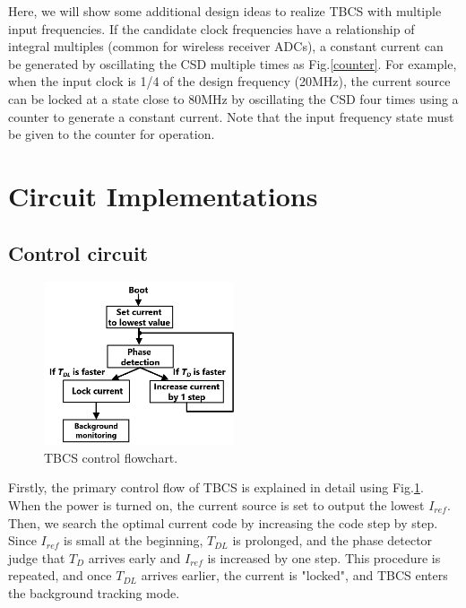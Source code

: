 \documentclass[paper]{ieice}
\begin{document}
Here, we will show some additional design ideas to realize TBCS with multiple input frequencies. If the candidate clock frequencies have a relationship of integral multiples (common for wireless receiver ADCs), a constant current can be generated by oscillating the CSD multiple times as Fig.\ref{counter}. For example, when the input clock is 1/4 of the design frequency (20MHz), the current source can be locked at a state close to 80MHz by oscillating the CSD four times using a counter to generate a constant current. Note that the input frequency state must be given to the counter for operation.


\section{Circuit Implementations}
\subsection{Control circuit}
\begin{figure}[!t]
\centering
 \includegraphics[width=0.5\textwidth]{figs/flowchart.png}
  \caption{TBCS control flowchart.}
\label{flow}
\end{figure}
\qquad Firstly, the primary control flow of TBCS is explained in detail using Fig.\ref{flow}. When the power is turned on, the current source is set to output the lowest $I_{ref}$. Then, we search the optimal current code by increasing the code step by step. Since $I_{ref}$ is small at the beginning, $T_{DL}$ is prolonged, and the phase detector judge that $T_D$ arrives early and $I_{ref}$ is increased by one step. This procedure is repeated, and once $T_{DL}$ arrives earlier, the current is "locked", and TBCS enters the background tracking mode.
\end{document}
